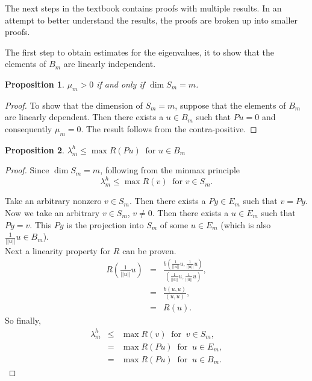 \documentclass[../../main.tex]{subfiles}
\begin{document}
The next steps in the textbook \cite{SF73} contains proofs with multiple results. In an attempt to better understand the results, the proofs are broken up into smaller proofs.

The first step to obtain estimates for the eigenvalues, it to show that the elements of $B_m$ are linearly independent.

\newtheorem{Prop_1}{Proposition}
\begin{Prop_1}
 $\mu_{m} > 0$ if and only if $\dim S_{m} = m$. \label{sym:mu}
\end{Prop_1}
\begin{proof}
	To show that the dimension of $S_m = m$, suppose that the elements of $B_m$ are linearly dependent. Then there exists a $u \in B_m$ such that $Pu = 0$ and consequently $\mu_m = 0$. The result follows from the contra-positive.
\end{proof}

\newtheorem{Prop_2}[Prop_1]{Proposition} \label{Prop_2}
\begin{Prop_2}
	$\lambda^{h}_{m} \leq \max R(Pu) \ \text{ for } u \in B_{m}$\\
\end{Prop_2}
\begin{proof}
	Since $\dim S_{m} = m$, following from the minmax principle
	\begin{equation*}
		\lambda_m^h \leq \max R(v) \ \text{ for } v \in S_m.
	\end{equation*}

	Take an arbitrary nonzero $v \in S_m$. Then there exists a $Py \in E_m$ such that $v = Py$.\\
 
	Now we take an arbitrary $v \in S_{m}$, $v \neq 0$. Then there exists a $u \in E_{m}$ such that $Py = v$. This $Py$ is the projection into $S_m$ of some $u \in E_m$ (which is also $\displaystyle \frac{1}{||u||}u \in B_m$).\\
	
	Next a linearity property for $R$ can be proven. 
	\begin{eqnarray*}
	R(\frac{1}{||u||}u) &=& \frac{b\left(\frac{1}{||u||}u,\frac{1}{||u||}u\right)}{\left(\frac{1}{||u||}u,\frac{1}{||u||}u\right)},\\
						&=& \frac{b(u,u)}{(u,u)},\\
						&=& R(u).
	\end{eqnarray*}
	So finally,
	\begin{eqnarray*}
	\lambda_{m}^{h} &\leq & \max R(v) \ \text{ for } \ v \in S_{m},\\
						&=& \max R(Pu) \ \text{ for } \ u \in E_{m},\\
						&=& \max R(Pu) \ \text{ for } \ u \in B_{m}.
	\end{eqnarray*}
\end{proof}
\end{document}
